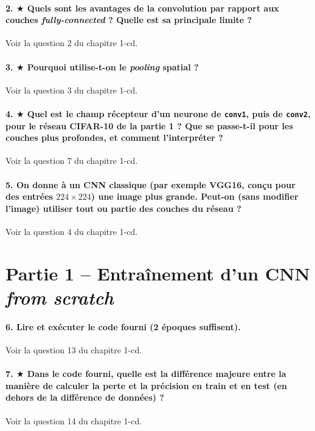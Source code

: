 \documentclass{report}
\begin{document}
\paragraph{2. $\bigstar$ Quels sont les avantages de la convolution par rapport aux couches \textit{fully-connected} ? Quelle est sa principale limite ?}
Voir la question 2 du chapitre 1-cd.

\paragraph{3. $\bigstar$ Pourquoi utilise-t-on le \textit{pooling} spatial ?}
Voir la question 3 du chapitre 1-cd.

\paragraph{4. $\bigstar$ Quel est le champ récepteur d'un neurone de \texttt{conv1}, puis de \texttt{conv2}, pour le réseau CIFAR-10 de la partie 1 ? Que se passe-t-il pour les couches plus profondes, et comment l'interpréter ?}
Voir la question 7 du chapitre 1-cd.

\paragraph{5. On donne à un CNN classique (par exemple VGG16, conçu pour des entrées $224 \times 224$) une image plus grande. Peut-on (sans modifier l'image) utiliser tout ou partie des couches du réseau ?}
Voir la question 4 du chapitre 1-cd.

\section{Partie 1 -- Entraînement d'un CNN \textit{from scratch}}

\paragraph{6. Lire et exécuter le code fourni (2 époques suffisent).}
Voir la question 13 du chapitre 1-cd.

\paragraph{7. $\bigstar$ Dans le code fourni, quelle est la différence majeure entre la manière de calculer la perte et la précision en train et en test (en dehors de la différence de données) ?}
Voir la question 14 du chapitre 1-cd.
\end{document}
